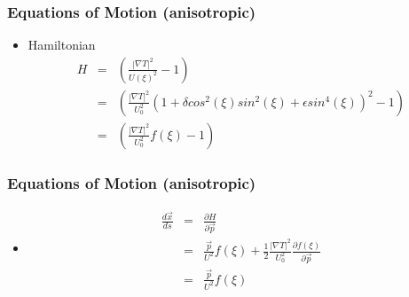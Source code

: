 \documentclass{beamer}
\begin{document}
\begin{frame}
\frametitle{Equations of Motion (anisotropic)}

\begin{itemize}

\pause \item Hamiltonian
\begin{eqnarray}
H &=& \left( \frac{|\nabla T|^2}{U(\xi)^2} - 1 \right) \nonumber \\
  &=& \left( \frac{|\nabla T|^2}{U_0^2}(1+\delta cos^2(\xi)sin^2(\xi)+\epsilon sin^4(\xi))^2 - 1 \right) \nonumber \\
  &=& \left( \frac{|\nabla T|^2}{U_0^2}f(\xi) - 1 \right) \nonumber
\end{eqnarray}

\end{itemize}

\end{frame}

\begin{frame}
\frametitle{Equations of Motion (anisotropic)}

\begin{itemize}

\pause \item 
\begin{eqnarray}
\frac{d\vec{x}}{ds} &=& \frac{\partial H}{\partial \vec{p}} \nonumber \\
&=& \frac{\vec{p}}{U^2} f(\xi) + \frac{1}{2} \frac{|\nabla T|^2}{U_0^2}\frac{\partial f(\xi)}{\partial \vec{p}} \nonumber \\
&=& \frac{\vec{p}}{U^2} f(\xi) \nonumber
\end{eqnarray}

\end{itemize}

\end{frame}
\end{document}

